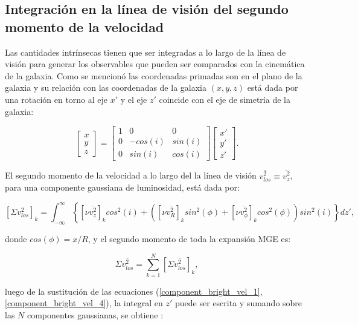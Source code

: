 \subsection{Integración en la línea de visión del segundo momento de la velocidad}

Las cantidades intrínsecas tienen que ser integradas a lo largo de la línea de visión para generar los observables que pueden ser comparados con la cinemática de la galaxia. Como se mencionó las coordenadas primadas son en el plano de la galaxia y su relación con las coordenadas de la galaxia $(x, y, z)$ está dada por una rotación en torno al eje $x'$ y el eje $z'$ coincide con el eje de simetría de la galaxia:

\[
\begin{bmatrix}
    x \\
    y \\
    z
\end{bmatrix}
=
\begin{bmatrix}
    1 & 0 & 0 \\
    0 & -cos(i) & sin(i) \\
    0 & sin(i) & cos(i)
\end{bmatrix}
\begin{bmatrix}
    x' \\
    y' \\
    z'
\end{bmatrix}.
\]

El segundo momento de la velocidad a lo largo del la línea de visión $\overline{v_{los}^2} \equiv \overline{v_z^2}$, para una componente gaussiana de luminosidad, está dada por:

\begin{equation}
\left[ \Sigma v_{los}^2 \right]_k = \int_{-\infty}^{\infty} \left \{ \left[  \nu \overline{v_{z}^2} \right]_k  cos^2 (i) + \left( \left[ \nu \overline{v_{R}^2} \right]_k sin^2 (\phi) + \left[ \nu \overline{v_{\phi}^2} \right]_k cos^2 (\phi) \right ) sin^2 (i) \right \} dz',
\end{equation}

donde $cos(\phi) = x/R$, y el segundo momento de toda la expansión MGE es:

\begin{equation}
 \Sigma \overline{v_{los}^2} = \sum_{k = 1}^N \left[ \Sigma \overline{v_{los}^2} \right]_k ,
\end{equation}

luego de la sustitución de las ecuaciones (\ref{component_bright_vel_1}, \ref{component_bright_vel_4}), la integral en $z'$ puede ser escrita y sumando sobre las $N$ componentes gaussianas, se obtiene \cite{2008MNRAS.390_71C}:


